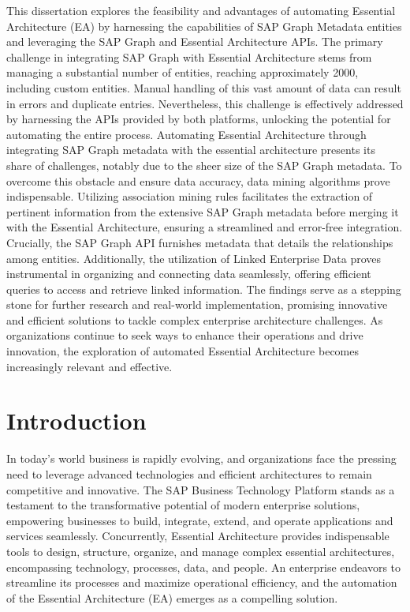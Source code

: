 \documentclass{article}
\begin{document}
This dissertation explores the feasibility and advantages of automating Essential Architecture (EA) by harnessing the capabilities of SAP Graph Metadata entities and leveraging the SAP Graph and Essential Architecture APIs. The primary challenge in integrating SAP Graph with Essential Architecture stems from managing a substantial number of entities, reaching approximately 2000, including custom entities. Manual handling of this vast amount of data can result in errors and duplicate entries. Nevertheless, this challenge is effectively addressed by harnessing the APIs provided by both platforms, unlocking the potential for automating the entire process. Automating Essential Architecture through integrating SAP Graph metadata with the essential architecture presents its share of challenges, notably due to the sheer size of the SAP Graph metadata. To overcome this obstacle and ensure data accuracy, data mining algorithms prove indispensable. Utilizing association mining rules facilitates the extraction of pertinent information from the extensive SAP Graph metadata before merging it with the Essential Architecture, ensuring a streamlined and error-free integration. Crucially, the SAP Graph API furnishes metadata that details the relationships among entities. Additionally, the utilization of Linked Enterprise Data proves instrumental in organizing and connecting data seamlessly, offering efficient queries to access and retrieve linked information. The findings serve as a stepping stone for further research and real-world implementation, promising innovative and efficient solutions to tackle complex enterprise architecture challenges. As organizations continue to seek ways to enhance their operations and drive innovation, the exploration of automated Essential Architecture becomes increasingly relevant and effective.

\newpage
\tableofcontents

\newpage
\maketitle
\section{Introduction}
In today’s world business is rapidly evolving, and organizations face the pressing need to leverage advanced technologies and efficient architectures to remain competitive and innovative. The SAP Business Technology Platform stands as a testament to the transformative potential of modern enterprise solutions, empowering businesses to build, integrate, extend, and operate applications and services seamlessly. Concurrently, Essential Architecture provides indispensable tools to design, structure, organize, and manage complex essential architectures, encompassing technology, processes, data, and people. An enterprise endeavors to streamline its processes and maximize operational efficiency, and the automation of the Essential Architecture (EA) emerges as a compelling solution.
\end{document}
